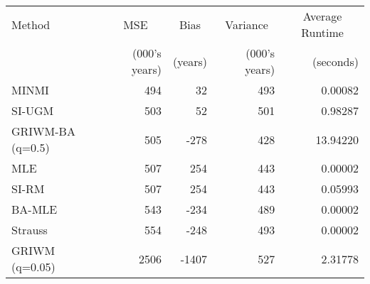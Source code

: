 
\begin{tabular}{lrrrr}
\toprule
\multicolumn{1}{l}{Method} & \multicolumn{1}{c}{MSE} & \multicolumn{1}{c}{Bias} & \multicolumn{1}{c}{Variance} & \multicolumn{1}{c}{Average Runtime} \\
 & (000's years) & (years) & (000's years) & (seconds)\\
\midrule
MINMI & 494 & 32 & 493 & 0.00082\\
SI-UGM & 503 & 52 & 501 & 0.98287\\
GRIWM-BA (q=0.5) & 505 & -278 & 428 & 13.94220\\
MLE & 507 & 254 & 443 & 0.00002\\
SI-RM & 507 & 254 & 443 & 0.05993\\
\addlinespace
BA-MLE & 543 & -234 & 489 & 0.00002\\
Strauss & 554 & -248 & 493 & 0.00002\\
GRIWM (q=0.05) & 2506 & -1407 & 527 & 2.31778\\
\bottomrule
\end{tabular}
